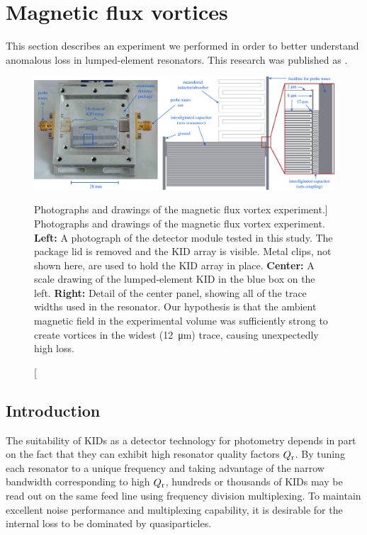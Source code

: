 \section{Magnetic flux vortices}
\label{sec:loss.vortex}

This section describes an experiment we performed in order to better understand anomalous loss in lumped-element resonators.
This research was published as .

\begin{figure}[tbp]
\centering
\includegraphics[width=\textwidth]{loss/experiment.eps}
\caption
[Photographs and drawings of the magnetic flux vortex experiment.]
{Photographs and drawings of the magnetic flux vortex experiment.
\textbf{Left:}
A photograph of the detector module tested in this study.
The package lid is removed and the KID array is visible.
Metal clips, not shown here, are used to hold the KID array in place.
\textbf{Center:}
A scale drawing of the lumped-element KID in the blue box on the left.
\textbf{Right:}
Detail of the center panel, showing all of the trace widths used in the resonator.
Our hypothesis is that the ambient magnetic field in the experimental volume was sufficiently strong to create vortices in the widest (\SI{12}{\micro m}) trace, causing unexpectedly high loss.}
\label{fig:loss.experiment}
\end{figure}

\subsection{Introduction}

The suitability of KIDs as a detector technology for photometry depends in part on the fact that they can exhibit high resonator quality factors $Q_{\mathrm{r}}$.
By tuning each resonator to a unique frequency and taking advantage of the narrow bandwidth corresponding to high $Q_{\mathrm{r}}$, hundreds or thousands of KIDs may be read out on the same feed line using frequency division multiplexing.
To maintain excellent noise performance and multiplexing capability, it is desirable for the internal loss to be dominated by quasiparticles.

